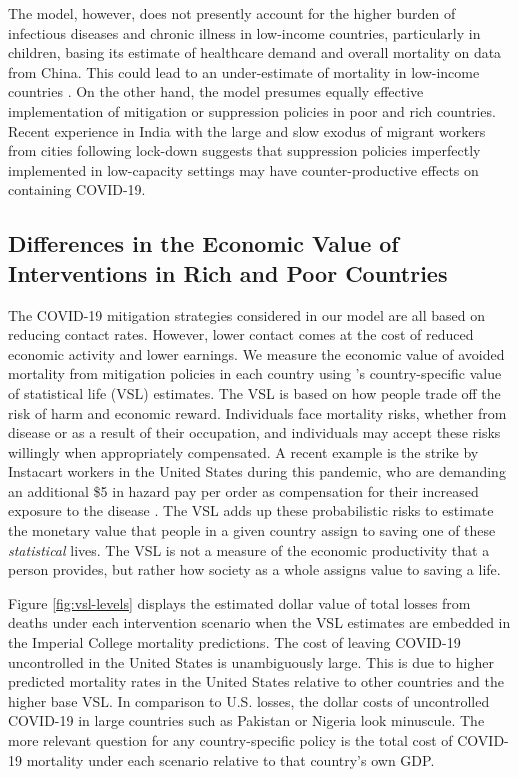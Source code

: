 \documentclass[11pt]{article}
\begin{document}
The model, however, does not presently account for the higher burden of infectious diseases and chronic illness in low-income countries, particularly in children, basing its estimate of healthcare demand and overall mortality on data from China. This could lead to an under-estimate of mortality in low-income countries \parencite{walker2020}. On the other hand, the model presumes equally effective implementation of mitigation or suppression policies in poor and rich countries. Recent experience in India with the large and slow exodus of migrant workers from cities following lock-down suggests that suppression policies imperfectly implemented in low-capacity settings may have counter-productive effects on containing COVID-19.

\subsection{Differences in the Economic Value of Interventions in Rich and Poor Countries}

The COVID-19 mitigation strategies considered in our model are all based on reducing contact rates. However, lower contact comes at the cost of reduced economic activity and lower earnings. We measure the economic value of avoided mortality from mitigation policies in each country using \textcite{viscusi2017}'s country-specific value of statistical life (VSL) estimates. The VSL is based on how people trade off the risk of harm and economic reward. Individuals face mortality risks, whether from disease or as a result of their occupation, and individuals may accept these risks willingly when appropriately compensated. A recent example is the strike by Instacart workers in the United States during this pandemic, who are demanding an additional \$5 in hazard pay per order as compensation for their increased exposure to the disease \parencite{wapo2020}. The VSL adds up these probabilistic risks to estimate the monetary value that people in a given country assign to saving one of these \textit{statistical} lives. The VSL is not a measure of the economic productivity that a person provides, but rather how society as a whole assigns value to saving a life.

Figure \ref{fig:vsl-levels} displays the estimated dollar value of total losses from deaths under each intervention scenario when the \textcite{viscusi2017} VSL estimates are embedded in the Imperial College mortality predictions. The cost of leaving COVID-19 uncontrolled in the United States is unambiguously large. This is due to higher predicted mortality rates in the United States relative to other countries and the higher base VSL. In comparison to U.S. losses, the dollar costs of uncontrolled COVID-19 in large countries such as Pakistan or Nigeria look minuscule. The more relevant question for any country-specific policy is the total cost of COVID-19 mortality under each scenario relative to that country's own GDP. 
\end{document}
